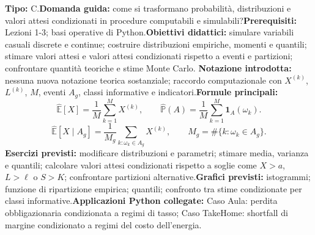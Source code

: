 \documentclass[12pt,a4paper]{article}%
\newcommand{\E}{\mathbb{E}}
\newcommand{\G}{\mathcal{G}}
\newcommand{\1}{\mathbf{1}}
\begin{document}
\textbf{Tipo:} C.\newline\textbf{Domanda guida:} come si trasformano
probabilit\`{a}, distribuzioni e valori attesi condizionati in procedure
computabili e simulabili?\newline\textbf{Prerequisiti:} Lezioni 1-3; basi
operative di Python.\newline\textbf{Obiettivi didattici:} simulare variabili
casuali discrete e continue; costruire distribuzioni empiriche, momenti e
quantili; stimare valori attesi e valori attesi condizionati rispetto a eventi
e partizioni; confrontare quantit\`{a} teoriche e stime Monte Carlo.\newline%
\textbf{Notazione introdotta:} nessuna nuova notazione teorica sostanziale;
raccordo computazionale con $X^{(k)}$, $L^{(k)}$, $M$, eventi $A_{g}$, classi
informative e indicatori.\newline\textbf{Formule principali:}
\[
\widehat{\mathbb{E}}[X]=\frac{1}{M}\sum_{k=1}^{M}X^{(k)}, \qquad
\widehat{\mathbb{P}}(A)=\frac{1}{M}\sum_{k=1}^{M}\1_{A}(\omega_{k}).
\]
\[
\widehat{\mathbb{E}}[X\mid A_{g}]=\frac{1}{M_{g}}\sum_{k:\omega_{k}\in A_{g}%
}X^{(k)}, \qquad M_{g}=\#\{k:\omega_{k}\in A_{g}\}.
\]
\textbf{Esercizi previsti:} modificare distribuzioni e parametri; stimare
media, varianza e quantili; calcolare valori attesi condizionati rispetto a
soglie come $X>a$, $L>\ell$ o $S>K$; confrontare partizioni
alternative.\newline\textbf{Grafici previsti:} istogrammi; funzione di
ripartizione empirica; quantili; confronto tra stime condizionate per classi
informative.\newline\textbf{Applicazioni Python collegate:} Caso Aula: perdita obbligazionaria condizionata
a regimi di tasso; Caso TakeHome: shortfall di margine condizionato a
regimi del costo dell'energia.


\end{document}

